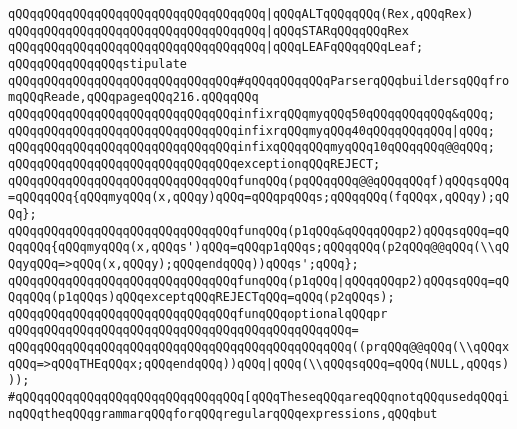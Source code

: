 \verb|qQQqqQQqqQQqqQQqqQQqqQQqqQQqqQQqqQQq|\verb#|qQQqALTqQQqqQQq(Rex,qQQqRex)#\newline
\verb|qQQqqQQqqQQqqQQqqQQqqQQqqQQqqQQqqQQq|\verb#|qQQqSTARqQQqqQQqRex#\newline
\verb|qQQqqQQqqQQqqQQqqQQqqQQqqQQqqQQqqQQq|\verb#|qQQqLEAFqQQqqQQqLeaf;#\newline
\newline
\verb|qQQqqQQqqQQqqQQqstipulate|\newline
\verb|qQQqqQQqqQQqqQQqqQQqqQQqqQQqqQQq#qQQqqQQqqQQqParserqQQqbuildersqQQqfromqQQqReade,qQQqpageqQQq216.qQQqqQQq|\newline
\newline
\verb|qQQqqQQqqQQqqQQqqQQqqQQqqQQqqQQqinfixrqQQqmyqQQq50qQQqqQQqqQQq&qQQq;|\newline
\verb|qQQqqQQqqQQqqQQqqQQqqQQqqQQqqQQqinfixrqQQqmyqQQq40qQQqqQQqqQQq|\verb#|qQQq;#\newline
\verb|qQQqqQQqqQQqqQQqqQQqqQQqqQQqqQQqinfixqQQqqQQqmyqQQq10qQQqqQQq@@qQQq;|\newline
\newline
\verb|qQQqqQQqqQQqqQQqqQQqqQQqqQQqqQQqexceptionqQQqREJECT;|\newline
\newline
\verb|qQQqqQQqqQQqqQQqqQQqqQQqqQQqqQQqfunqQQq(pqQQqqQQq@@qQQqqQQqf)qQQqsqQQq=qQQqqQQq{qQQqmyqQQq(x,qQQqy)qQQq=qQQqpqQQqs;qQQqqQQq(fqQQqx,qQQqy);qQQq};|\newline
\verb|qQQqqQQqqQQqqQQqqQQqqQQqqQQqqQQqfunqQQq(p1qQQq&qQQqqQQqp2)qQQqsqQQq=qQQqqQQq{qQQqmyqQQq(x,qQQqs')qQQq=qQQqp1qQQqs;qQQqqQQq(p2qQQq@@qQQq(\\qQQqyqQQq=>qQQq(x,qQQqy);qQQqendqQQq))qQQqs';qQQq};|\newline
\verb|qQQqqQQqqQQqqQQqqQQqqQQqqQQqqQQqfunqQQq(p1qQQq|\verb#|qQQqqQQqp2)qQQqsqQQq=qQQqqQQq(p1qQQqs)qQQqexceptqQQqREJECTqQQq=qQQq(p2qQQqs);#\newline
\newline
\verb|qQQqqQQqqQQqqQQqqQQqqQQqqQQqqQQqfunqQQqoptionalqQQqpr|\newline
\verb|qQQqqQQqqQQqqQQqqQQqqQQqqQQqqQQqqQQqqQQqqQQqqQQq=|\newline
\verb|qQQqqQQqqQQqqQQqqQQqqQQqqQQqqQQqqQQqqQQqqQQqqQQq((prqQQq@@qQQq(\\qQQqxqQQq=>qQQqTHEqQQqx;qQQqendqQQq))qQQq|\verb#|qQQq(\\qQQqsqQQq=qQQq(NULL,qQQqs)));#\newline
\newline
\verb|#qQQqqQQqqQQqqQQqqQQqqQQqqQQqqQQq[qQQqTheseqQQqareqQQqnotqQQqusedqQQqinqQQqtheqQQqgrammarqQQqforqQQqregularqQQqexpressions,qQQqbut|\newline
